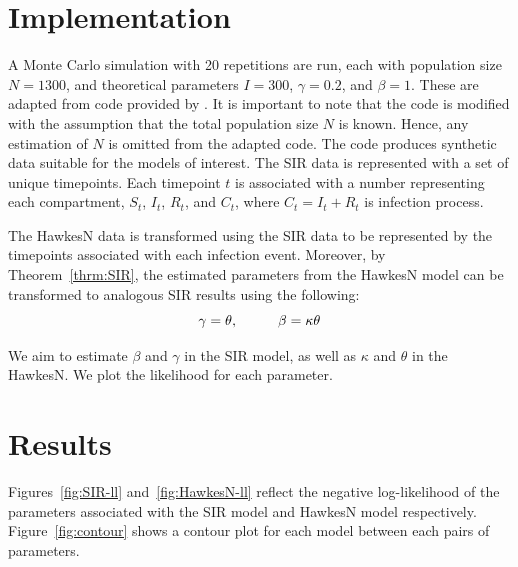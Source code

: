 \documentclass[12pt]{article}
\begin{document}




\section{Implementation}

A Monte Carlo simulation with 20 repetitions are run, each with population size $N = 1300$, and theoretical parameters $I = 300$, $\gamma = 0.2$, and $\beta = 1$. These are adapted from code provided by \citep{Rizoiu2018}.  It is important to note that the code is modified with the assumption that the total population size $N$ is known. Hence, any estimation of $N$ is omitted from the adapted code. The code produces synthetic data suitable for the models of interest. The SIR data is represented with a set of unique timepoints. Each timepoint $t$ is associated with a number representing each compartment, $S_t$, $I_t$, $R_t$, and $C_t$, where $C_t = I_t + R_t$ is infection process. 
 
The HawkesN data is transformed using the SIR data to be represented by the timepoints associated with each infection event. Moreover, by Theorem~\ref{thrm:SIR}, the estimated parameters from the HawkesN model can be transformed to analogous SIR results using the following:
\[
\gamma = \theta, \hspace{10mm}
\beta = \kappa \theta
\]

We aim to estimate $\beta$ and $\gamma$ in the SIR model, as well as $\kappa$ and $\theta$ in the HawkesN. We plot the likelihood for each parameter. 




\section{Results}

Figures~\ref{fig:SIR-ll} and~\ref{fig:HawkesN-ll} reflect the negative log-likelihood of the parameters associated with the SIR model and HawkesN model respectively. Figure~\ref{fig:contour} shows a contour plot for each model between each pairs of parameters. 
\end{document}
